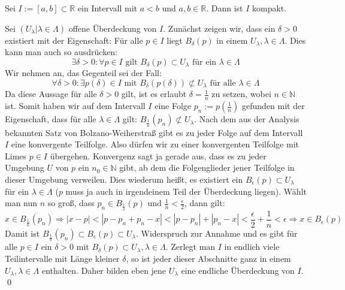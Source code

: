 \begin{Satz}\label{satz:intervall}
	Sei \(I := [ a , b ] \subset \mathbb{R}\) ein Intervall mit \(a<b\) und \(a,b \in \mathbb{R}\). Dann 
	ist \(I\) kompakt.
\end{Satz}
	Sei \( (U_{\lambda} | \lambda \in \Lambda) \) offene Überdeckung von \(I\). Zunächst zeigen wir,
	dass ein \(\delta > 0\) existiert mit der Eigenschaft: Für alle \(p \in I\) liegt \(B_{\delta}(p)\)
	in einem \(U_{\lambda}, \lambda \in \Lambda\). Dies kann man auch so ausdrücken: 
	\[ \exists \delta > 0 : \forall p \in I \mbox{ gilt } B_{\delta}(p) \subset U_{\lambda} \mbox { für ein } \lambda \in \Lambda \]
	Wir nehmen an, das Gegenteil sei der Fall:
	\[ \forall \delta > 0 : \exists p(\delta) \in I \mbox{ mit } B_{\delta}(p(\delta)) \not\subset U_{\lambda} \mbox { für alle } \lambda \in \Lambda \]
	Da diese Aussage für alle \(\delta > 0\) gilt, ist es erlaubt \(\delta = \frac{1}{n}\) zu setzen, wobei \(n \in \mathbb{N}\) ist.
	Somit haben wir auf dem Intervall \(I\) eine Folge \(p_{n} := p(\frac{1}{n})\) gefunden mit der Eigenschaft, dass für alle \(\lambda \in \Lambda\)
	gilt: \(B_{\frac{1}{n}}(p_{n}) \not\subset U_{\lambda}\). Nach dem aus der Analysis bekannten Satz von Bolzano-Weiherstraß gibt
	es zu jeder Folge auf dem Intervall \(I\) eine konvergente Teilfolge. Also dürfen wir zu einer konvergenten Teilfolge mit Limes \(p \in I\) übergehen.
  Konvergenz sagt ja gerade aus, dass es zu jeder Umgebung \(U\) von \(p\) ein \(n_0 \in \mathbb{N}\) gibt, 
	ab dem die Folgenglieder jener Teilfolge in dieser Umgebung verweilen. Dies wiederum heißt, es existiert ein \(B_{\epsilon}(p) \subset U_{\lambda}\) für ein \(\lambda \in \Lambda\)
	(\(p\) muss ja auch in irgendeinem Teil der Überdeckung liegen). Wählt man nun \(n\) so groß, dass \(p_n \in B_{\frac{\epsilon}{2}}(p)\) und \(\frac{1}{n} < \frac{\epsilon}{2}\),
	dann gilt:
	\[ x \in B_{\frac{1}{n}}(p_n) \Rightarrow |x-p| < |p-p_n+p_n-x| < |p-p_n| + |p_n-x| < \frac{\epsilon}{2} + \frac{1}{n} < \epsilon \Rightarrow x \in B_{\epsilon}(p) \]
	Damit ist \(B_{\frac{1}{n}}(p_n) \subset B_{\epsilon}(p) \subset U_{\lambda}\).
	Widerspruch zur Annahme und es gibt für alle \(p \in I\) ein \(\delta > 0\) mit \(B_{\delta}(p) \subset U_{\lambda}, \lambda \in \Lambda\).
	Zerlegt man \(I\) in endlich viele Teilintervalle mit Länge kleiner \(\delta\), so ist jeder dieser Abschnitte ganz in einem \(U_{\lambda}, \lambda \in \Lambda\)
	enthalten. Daher bilden eben jene \(U_{\lambda}\) eine endliche Überdeckung von \(I\).
\qed

